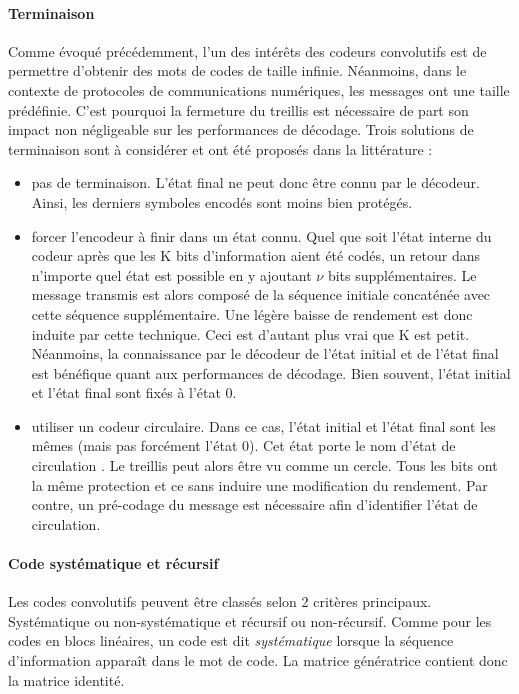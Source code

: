 \paragraph*{Terminaison}\label{par:term}
Comme évoqué précédemment, l'un des intérêts des codeurs convolutifs est de permettre d'obtenir des mots de codes de 
taille infinie. Néanmoins, dans le contexte de protocoles de communications numériques, les messages ont une taille 
prédéfinie. C'est pourquoi la fermeture du treillis est nécessaire de part son impact non négligeable sur les performances de 
décodage. Trois solutions de terminaison sont à considérer et ont été proposés dans la littérature :
\begin{itemize}
	\item pas de terminaison. L'état final ne peut donc être connu par le décodeur. Ainsi, les derniers symboles encodés
	      sont moins bien protégés. 
	\item forcer l'encodeur à finir dans un état connu. 
	      Quel que soit l'état interne du codeur après que les K bits d'information aient été codés, un retour dans n'importe 
	      quel état est possible en y ajoutant $\nu$ bits supplémentaires. Le message transmis est alors composé de la 
	      séquence initiale concaténée avec cette séquence supplémentaire. Une légère baisse de rendement est donc induite par cette technique. 
	      Ceci est d'autant plus vrai que K est petit. 
	      Néanmoins, la connaissance par le décodeur de l'état initial et de l'état final est bénéfique quant aux performances de décodage. Bien souvent, l'état initial et l'état final sont fixés à l'état 0.
	\item utiliser un codeur circulaire. Dans ce cas, l'état initial et l'état final sont les mêmes (mais pas forcément 
	      l'état 0). Cet état porte le nom d'état de circulation \cite{circular}. Le treillis peut alors être vu comme un 
	      cercle. Tous les bits ont la même protection et ce sans induire une modification du rendement. Par contre, 
	      un pré-codage du message est nécessaire afin d'identifier l'état de circulation.
\end{itemize}

\paragraph*{Code systématique et récursif}
Les codes convolutifs peuvent être classés selon 2 critères principaux. Systématique ou non-systématique et récursif ou
non-récursif. 
Comme pour les codes en blocs linéaires, un code est dit \emph{systématique} lorsque la séquence 
d'information apparaît dans le mot de code. La matrice génératrice contient donc la matrice identité. 

